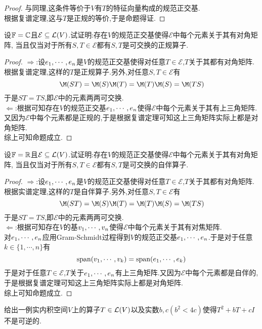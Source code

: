 \documentclass{ctexart}
\begin{document}
\begin{proof}
    与同理,这条件等价于$V$有$T$的特征向量构成的规范正交基.\\
    根据复谱定理,这与$T$是正规的等价,于是命题得证.
\end{proof}
\begin{problem}[16.]
    设$\mathbb{F}=\mathbb{C}$且$\mathcal{E}\subseteq\mathcal{L}(V)$.试证明:存在$V$的规范正交基使得$\mathcal{E}$中每个元素关于其有对角矩阵,%
    当且仅当对于所有$S,T\in\mathcal{E}$都有$S,T$是可交换的正规算子.
\end{problem}
\begin{proof}
    $\Rightarrow$:设${e}_1,\cdots,{e}_{n}$是$V$的规范正交基使得对任意$T\in\mathcal{E}$,$T$关于其都有对角矩阵.\\
    根据复谱定理,这样的$T$是正规算子.另外,对任意$S,T\in\mathcal{E}$有
    \[\M(ST)=\M(S)\M(T)=\M(T)\M(S)=\M(TS)\]
    于是$ST=TS$,即$\mathcal{E}$中的元素两两可交换.\\
    $\Leftarrow$:根据可知存在$V$的规范正交基${e}_1,\cdots,{e}_{n}$使得$\mathcal{E}$中每个元素关于其有上三角矩阵.\\
    又因为$\mathcal{E}$中每个元素都是正规的,于是根据复谱定理可知这上三角矩阵实际上都是对角矩阵.\\
    综上可知命题成立.
\end{proof}
\begin{problem}[17.]
    设$\mathbb{F}=\mathbb{R}$且$\mathcal{E}\subseteq\mathcal{L}(V)$.试证明:存在$V$的规范正交基使得$\mathcal{E}$中每个元素关于其有对角矩阵,%
    当且仅当对于所有$S,T\in\mathcal{E}$都有$S,T$是可交换的自伴算子.
\end{problem}
\begin{proof}
    $\Rightarrow$:设${e}_1,\cdots,{e}_{n}$是$V$的规范正交基使得对任意$T\in\mathcal{E}$,$T$关于其都有对角矩阵.\\
    根据实谱定理,这样的$T$是自伴算子.另外,对任意$S,T\in\mathcal{E}$有
    \[\M(ST)=\M(S)\M(T)=\M(T)\M(S)=\M(TS)\]
    于是$ST=TS$,即$\mathcal{E}$中的元素两两可交换.\\
    $\Leftarrow$:根据可知存在$V$的基${v}_1,\cdots,{v}_{n}$使得$\mathcal{E}$中每个元素关于其有对焦矩阵.\\
    对${e}_1,\cdots,{e}_{n}$应用Gram-Schmidt过程得到$V$的规范正交基${e}_1,\cdots,{e}_{n}$.于是对于任意$k\in\{1,\cdots,n\}$有
    \[\text{span}({v}_1,\cdots,{v}_{k})=\text{span}({e}_1,\cdots,{e}_{k})\]
    于是对于任意$T\in\mathcal{E}$,$T$关于${e}_1,\cdots,{e}_{n}$有上三角矩阵.又因为$\mathcal{E}$中每个元素都是自伴的,于是根据复谱定理可知这上三角矩阵实际上都是对角矩阵.\\
    综上可知命题成立.
\end{proof}
\begin{problem}[18.]
    给出一例实内积空间$V$上的算子$T\in\mathcal{L}(V)$以及实数$b,c(b^2<4c)$使得$T^2+bT+cI$不是可逆的.
\end{problem}
\end{document}
